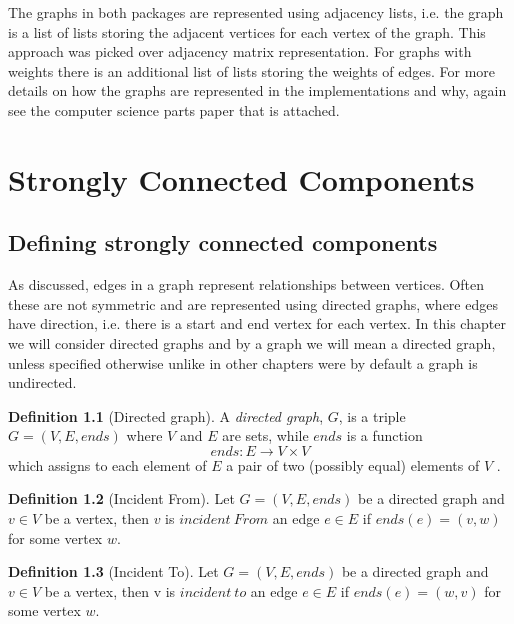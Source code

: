 \documentclass{report}
\theoremstyle{plain}
\theoremstyle{definition}
\newtheorem{definition}{Definition}
\theoremstyle{remark}
\numberwithin{definition}{chapter}
\numberwithin{example}{chapter}
\numberwithin{figure}{chapter}
\numberwithin{theorem}{chapter}
\numberwithin{lemma}{chapter}
\begin{document}
The graphs in both packages are represented using adjacency lists, i.e. the graph is a list of lists storing the adjacent vertices for each vertex of the graph. This approach was picked over adjacency matrix representation. For graphs with weights there is an additional list of lists storing the weights of edges. For more details on how the graphs are represented in the implementations and why, again see the computer science parts paper that is attached.

\chapter{Strongly Connected Components}

\section{Defining strongly connected components}

As discussed, edges in a graph represent relationships between vertices. Often these are not symmetric and are represented using directed graphs, where edges have direction, i.e. there is a start and end vertex for each vertex. In this chapter we will consider directed graphs and by a graph we will mean a directed graph, unless specified otherwise unlike in other chapters were by default a graph is undirected.

\begin{definition}[Directed graph]
A \emph{directed graph}, $G$, is a triple $G = (V, E, ends)$ where $V$ and $E$ are sets, while $ends$ is a function 
  \begin{equation}
  ends:E\to V \times V
  \end{equation}
which assigns to each element of $E$ a pair of two (possibly equal) elements of $V$ .
\end{definition}

\begin{definition}[Incident From]
Let $G = (V, E, ends)$ be a directed graph and $v \in V$ be a vertex, then $v$ is $incident \ From$ an edge $e \in E$ if $ends(e)=(v, w)$ for some vertex $w$.
\end{definition}

\begin{definition}[Incident To]
Let $G = (V, E, ends)$ be a directed graph and $v \in V$ be a vertex, then v is $incident \ to$ an edge $e \in E$ if $ends(e)=(w, v)$ for some vertex $w$.
\end{definition}
\end{document}
